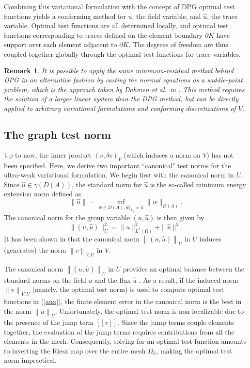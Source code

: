 \documentclass[11pt,onecolumn]{scrartcl}
\newcommand{\nor}[1]{\left\| #1 \right\|}
\newcommand{\LRp}[1]{\left( #1 \right)}
\newcommand{\LRs}[1]{\left[ #1 \right]}
\newcommand{\jump}[1] {\ensuremath{\LRs{\!\left[#1\right]\!}}}
\newcommand{\uh}{\widehat{u}}
\renewcommand{\L}{L^2\LRp{\Omega}}
\newcommand{\Gh}{\Gamma_h}
\newcommand{\Oh}{\Omega_h}
\newtheorem{remark}{Remark}
\begin{document}
Combining this variational formulation with the concept of DPG optimal test functions yields a conforming method for $u$, the field variable, and $\uh$, the trace variable. Optimal test functions are all determined locally, and optimal test functions corresponding to traces defined on the element boundary $\partial K$ have support over each element adjacent to $\partial K$.  The degrees of freedom are thus coupled together globally through the optimal test functions for trace variables.  

\begin{remark}
\label{remarkDahmen}
It is possible to apply the same minimum-residual method behind DPG in an alternative fashion by casting the normal equations as a saddle-point problem, which is the approach taken by Dahmen et al.\ in \cite{DahmenVariationalStabilization}. This method requires the solution of a larger linear system than the DPG method, but can be directly applied to arbitrary variational formulations and conforming discretizations of $V$.  
\end{remark}

\subsection{The graph test norm}

Up to now, the inner product $\LRp{v,\delta v}_V$ (which induces a norm on $V$) has not been specified.  Here, we derive two important ``canonical" test norms for the ultra-weak variational formulation.  We begin first with the canonical norm in $U$. Since $\uh \in \gamma\LRp{D\LRp{A}}$, the standard norm for $\uh$ is the so-called minimum energy extension norm defined as
\begin{equation*}
\|\widehat{u}\| = \inf_{w\in D\LRp{A},
  \left.w\right|_{\Gh}=\widehat{u}} \|w\|_{D\LRp{A}}.
\end{equation*}
The canonical norm for the group variable $\LRp{u,\uh}$ is then given by
\[
\|\left(u,\widehat{u}\right)\|_U^2 = \|u\|^2_{\L} + \|\widehat{u}\|^2.
\]
It has been shown in \cite{Bui-ThanhDemkowiczGhattas11a, ChanHeuerBui-ThanhDemkowicz12} that the canonical norm $\nor{\LRp{u,\uh}}_U$ in $U$ induces (generates) the norm $\nor{v}_{V,U}$ in $V$.  

The canonical norm $\nor{\LRp{u,\uh}}_U$ in $U$ provides an optimal balance between the standard norms on the field $u$ and the flux $\uh$ \cite{DPG4}. As a result, if the induced norm $\nor{v}_{V,U}$ (namely, the optimal test norm) is used to compute optimal test functions in (\ref{aux}), the finite element error in the canonical norm is the best in the norm $\nor{u}_{U}$. Unfortunately, the optimal test norm is non-localizable due to the presence of the jump term $\jump{v}$. Since the jump terms couple elements together, the evaluation of the jump terms requires contributions from all the elements in the mesh. 
Consequently, solving for an optimal test function amounts to inverting the Riesz map over the entire mesh $\Oh$, making the optimal test norm impractical.
\end{document}
